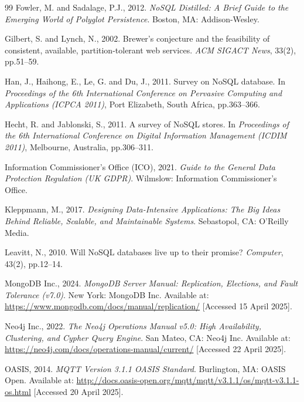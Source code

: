 \documentclass[11pt,a4paper]{article}
\begin{document}
\begin{thebibliography}{99}
Fowler, M. and Sadalage, P.J., 2012. \textit{NoSQL Distilled: A Brief Guide to the Emerging World of Polyglot Persistence}. Boston, MA: Addison-Wesley.

Gilbert, S. and Lynch, N., 2002. Brewer's conjecture and the feasibility of consistent, available, partition-tolerant web services. \textit{ACM SIGACT News}, 33(2), pp.51--59.

Han, J., Haihong, E., Le, G. and Du, J., 2011. Survey on NoSQL database. In \textit{Proceedings of the 6th International Conference on Pervasive Computing and Applications (ICPCA 2011)}, Port Elizabeth, South Africa, pp.363--366.

Hecht, R. and Jablonski, S., 2011. A survey of NoSQL stores. In \textit{Proceedings of the 6th International Conference on Digital Information Management (ICDIM 2011)}, Melbourne, Australia, pp.306--311.

Information Commissioner's Office (ICO), 2021. \textit{Guide to the General Data Protection Regulation (UK GDPR)}. Wilmslow: Information Commissioner's Office.

Kleppmann, M., 2017. \textit{Designing Data-Intensive Applications: The Big Ideas Behind Reliable, Scalable, and Maintainable Systems}. Sebastopol, CA: O'Reilly Media.

Leavitt, N., 2010. Will NoSQL databases live up to their promise? \textit{Computer}, 43(2), pp.12--14.

MongoDB Inc., 2024. \textit{MongoDB Server Manual: Replication, Elections, and Fault Tolerance (v7.0)}. New York: MongoDB Inc. Available at: \url{https://www.mongodb.com/docs/manual/replication/} [Accessed 15 April 2025].

Neo4j Inc., 2022. \textit{The Neo4j Operations Manual v5.0: High Availability, Clustering, and Cypher Query Engine}. San Mateo, CA: Neo4j Inc. Available at: \url{https://neo4j.com/docs/operations-manual/current/} [Accessed 22 April 2025].

OASIS, 2014. \textit{MQTT Version 3.1.1 OASIS Standard}. Burlington, MA: OASIS Open. Available at: \url{http://docs.oasis-open.org/mqtt/mqtt/v3.1.1/os/mqtt-v3.1.1-os.html} [Accessed 20 April 2025].


\end{thebibliography}
\end{document}
